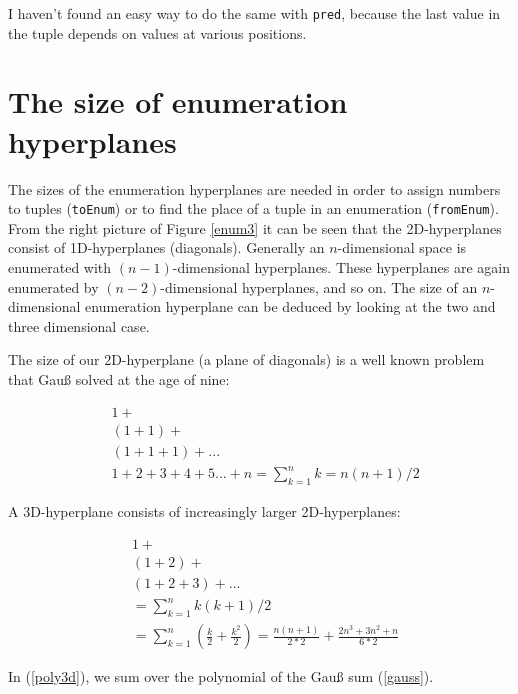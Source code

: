 \documentclass{tmr}
\begin{document}
I haven't found an easy way to do the same with \verb|pred|, because the last value in the tuple depends on values at various positions.

\section {The size of enumeration hyperplanes}

The sizes of the enumeration hyperplanes are needed in order to assign numbers to tuples (\verb|toEnum|) or to find the place of a tuple in an enumeration  (\verb|fromEnum|).  From the right picture of Figure \ref{enum3} it can be seen that the 2D-hyperplanes consist of 1D-hyperplanes (diagonals).  Generally an $n$-dimensional space is enumerated with $(n-1)$-dimensional hyperplanes. These hyperplanes are again enumerated by $(n-2)$-dimensional hyperplanes, and so on. The size of an $n$-dimensional enumeration hyperplane can be deduced by looking at the two and three dimensional case.

The size of our 2D-hyperplane (a plane of diagonals) is a well known problem that Gauß solved at the age of nine:

\begin{equation}\label{gauss}
\begin{split}
& 1 +\\
&(1+1) +\\
&(1+1+1) + ... \\
& 1+2+3+4+5 ... + n  = \sum_{k=1}^{n} k =  n (n+1)/2
\end{split}
\end{equation}


A 3D-hyperplane consists of increasingly larger 2D-hyperplanes:

\begin{equation} \label{poly3d}
\begin{split}
& 1 +\\
&(1+2) +\\
&(1+2+3) + ... \\
& = \sum_{k=1}^{n}  k (k+1)/2 \\
& = \sum_{k=1}^{n} (\frac{k}{2} + \frac{k^2}{2}) = \frac{ n (n+1) }{2*2} + \frac{2n^3+3n^2+n}{6*2} 
\end{split}
\end{equation}

In (\ref{poly3d}), we sum over the polynomial of the Gauß sum (\ref{gauss}).
\end{document}
